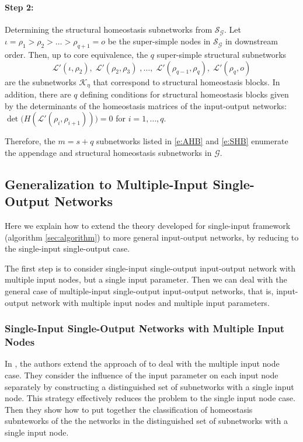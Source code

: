\documentclass[pdflatex,sn-basic,Numbered]{sn-jnl}
\newcommand{\GG}{{\mathcal G}}
\newcommand{\KK}{{\mathcal K}}
\newcommand{\LL}{{\mathcal L}}
\newcommand{\sS}{{\mathcal S}}
\theoremstyle{thmstyleone}%
\numberwithin{equation}{section}
\begin{document}
\paragraph{Step 2:} Determining the structural homeostasis subnetworks from $\sS_\GG$. 
Let $\iota = \rho_1 > \rho_2 > \ldots > \rho_{q+1} = o$ be the super-simple nodes in $\sS_\GG$ in downstream order.
Then, up to core equivalence, the $q$ super-simple structural subnetworks 
\begin{equation} \label{e:SHB}
\LL'(\iota,\rho_2),\; \LL'(\rho_2,\rho_3) \;,\ldots,\; \LL'(\rho_{q-1},\rho_q),\; \LL'(\rho_q,o)
\end{equation}
are the subnetworks $\KK_\eta$ that correspond to structural homeostasis blocks. 
In addition, there are  $q$ defining conditions for structural homeostasis blocks given by the determinants of the homeostasis matrices of the input-output networks: $\det\big(H(\LL'(\rho_i,\rho_{i+1}))\big) = 0$ for $i = 1,\ldots, q$.

Therefore, the $m = s + q$ subnetworks listed in \eqref{e:AHB} and \eqref{e:SHB} enumerate the appendage and structural homeostasis subnetworks in $\GG$. 



\subsection{Generalization to Multiple-Input Single-Output Networks}
\label{sec:multipleinput}

Here we explain how to extend the theory developed for single-input framework (algorithm \ref{sec:algorithm}) to more general input-output networks, by reducing to the single-input single-output case.

The first step is to consider 
single-input single-output input-output network with multiple input nodes, but a single input parameter.
Then we can deal with the general case of multiple-input single-output input-output networks, that is, input-output network with multiple input nodes and multiple input parameters.

\subsubsection{Single-Input Single-Output Networks with Multiple Input Nodes}
\label{sec:siso_mi}

In \cite{madeira2022homeostasis}, the authors extend the approach of \cite{WHAG21} to deal with the multiple input node case.
They consider the influence of the input parameter on each input node separately by constructing a distinguished set of subnetworks with a single input node.
This strategy effectively reduces the problem to the single input node case.
Then they show how to put together the classification of homeostasis subnteworks of the the networks in the distinguished set of subnetworks with a single input node.
\end{document}
